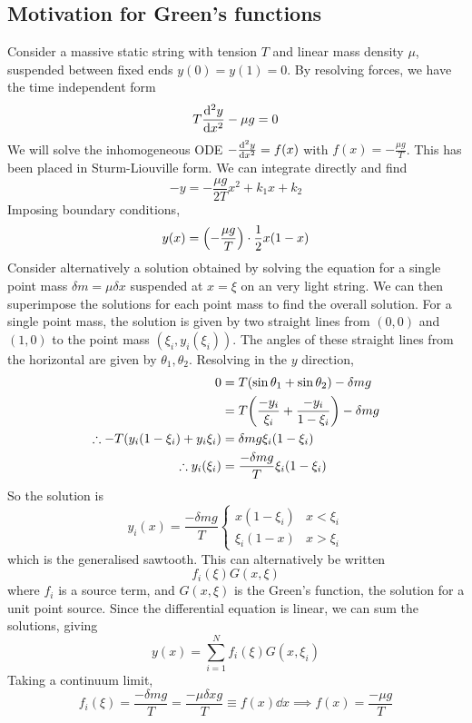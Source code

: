 \subsection{Motivation for Green's functions}
Consider a massive static string with tension \( T \) and linear mass density \( \mu \), suspended between fixed ends \( y(0) = y(1) = 0 \).
By resolving forces, we have the time independent form
\[
	T \dv[2]{y}{x} - \mu g = 0
\]
We will solve the inhomogeneous ODE \( - \dv[2]{y}{x} = f(x) \) with \( f(x) = -\frac{\mu g}{T} \).
This has been placed in Sturm-Liouville form.
We can integrate directly and find
\[
	-y = -\frac{\mu g}{2T} x^2 + k_1 x + k_2
\]
Imposing boundary conditions,
\[
	y(x) = \qty(-\frac{\mu g}{T}) \cdot \frac{1}{2}x(1-x)
\]
Consider alternatively a solution obtained by solving the equation for a single point mass \( \delta m = \mu \delta x \) suspended at \( x = \xi \) on an very light string.
We can then superimpose the solutions for each point mass to find the overall solution.
For a single point mass, the solution is given by two straight lines from \( (0,0) \) and \( (1,0) \) to the point mass \( (\xi_i, y_i(\xi_i)) \).
The angles of these straight lines from the horizontal are given by \( \theta_1, \theta_2 \).
Resolving in the \( y \) direction,
\begin{align*}
	0                                           & = T (\sin \theta_1 + \sin \theta_2) - \delta m g                \\
	                                            & = T\qty(\frac{-y_i}{\xi_i} + \frac{-y_i}{1-\xi_i}) - \delta m g \\
	\therefore -T\qty(y_i(1-\xi_i) + y_i \xi_i) & = \delta m g \xi_i(1-\xi_i)                                     \\
	\therefore y_i(\xi_i)                       & = \frac{-\delta m g}{T} \xi_i (1-\xi_i)
\end{align*}
So the solution is
\[
	y_i(x) = \frac{-\delta m g}{T} \begin{cases}
		x(1-\xi_i)    & x < \xi_i \\
		\xi_i (1 - x) & x > \xi_i
	\end{cases}
\]
which is the generalised sawtooth.
This can alternatively be written
\[
	f_i(\xi) G(x,\xi)
\]
where \( f_i \) is a source term, and \( G(x,\xi) \) is the Green's function, the solution for a unit point source.
Since the differential equation is linear, we can sum the solutions, giving
\[
	y(x) = \sum_{i=1}^N f_i(\xi) G(x, \xi_i)
\]
Taking a continuum limit,
\[
	f_i(\xi) = \frac{-\delta m g}{T} = \frac{-\mu \delta x g}{T} \equiv f(x) \dd{x} \implies f(x) = \frac{-\mu g}{T}
\]

